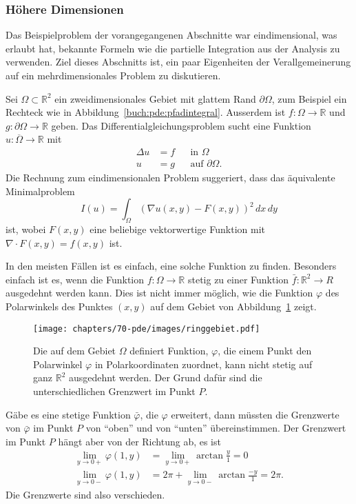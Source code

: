 \subsubsection{Höhere Dimensionen}
Das Beispielproblem der vorangegangenen Abschnitte war eindimensional,
was erlaubt hat, bekannte Formeln wie die partielle Integration aus der
Analysis zu verwenden.
Ziel dieses Abschnitts ist, ein paar Eigenheiten der Verallgemeinerung
auf ein mehrdimensionales Problem zu diskutieren.

Sei $\Omega\subset\mathbb R^2$ ein zweidimensionales Gebiet mit glattem
Rand $\partial \Omega$,
zum Beispiel ein Rechteck wie in Abbildung~\ref{buch:pde:pfadintegral}.
Ausserdem ist $f\colon\Omega\to\mathbb R$ und
$g\colon\partial\Omega\to\mathbb R$ geben.
Das Differentialgleichungsproblem sucht
eine Funktion $u\colon\overline{\Omega}\to\mathbb R$ mit
\begin{equation}
\begin{aligned}
\Delta u&=f &&\text{in $\Omega$}
\\
u&=g&&\text{auf $\partial\Omega$}.
\end{aligned}
\label{buch:pde:eqn:dgl2d}
\end{equation}
Die Rechnung zum eindimensionalen Problem suggeriert, dass 
das äquivalente Minimalproblem 
\begin{equation}
I(u)
=
\int_{\Omega} (\nabla u(x,y) - F(x,y))^2\,dx\,dy
\label{buch:pde:eqn:minimal2d}
\end{equation}
ist, wobei $F(x,y)$ eine beliebige vektorwertige Funktion mit
$\nabla\cdot F(x,y) = f(x,y)$ ist.

In den meisten Fällen ist es einfach, eine solche Funktion zu
finden.
Besonders einfach ist es, wenn die Funktion $f\colon\Omega\to\mathbb R$
stetig zu einer Funktion $\bar{f}\colon\mathbb R^2\to R$ ausgedehnt
werden kann.
Dies ist nicht immer möglich, wie die Funktion $\varphi$ des Polarwinkels
des Punktes $(x,y)$ auf dem Gebiet von
Abbildung~\ref{buch:pde:figure:ringgebiet} zeigt.
%
\begin{figure}
\centering
\texttt{[image: chapters/70-pde/images/ringgebiet.pdf]}
\caption{Die auf dem Gebiet $\Omega$ definiert Funktion, $\varphi$,
die einem Punkt den Polarwinkel $\varphi$ in Polarkoordinaten zuordnet,
kann nicht stetig auf ganz $\mathbb R^2$ ausgedehnt werden.
%
Der Grund dafür sind die unterschiedlichen Grenzwert im Punkt $P$.
\label{buch:pde:figure:ringgebiet}}
\end{figure}
Gäbe es eine stetige Funktion $\bar{\varphi}$, die $\varphi$ erweitert, dann
müssten die Grenzwerte von $\bar{\varphi}$ im Punkt $P$ von ``oben'' und
von ``unten'' übereinstimmen.
Der Grenzwert im Punkt $P$ hängt aber von der Richtung ab,
es ist
\begin{align*}
\lim_{y\to 0+}\varphi(1,y) &= \lim_{y\to 0+}\arctan\frac{y}{1} = 0
\\
\lim_{y\to 0-}\varphi(1,y) &= 2\pi + \lim_{y\to 0-}\arctan\frac{-y}{1} = 2\pi.
\end{align*}
Die Grenzwerte sind also verschieden.

